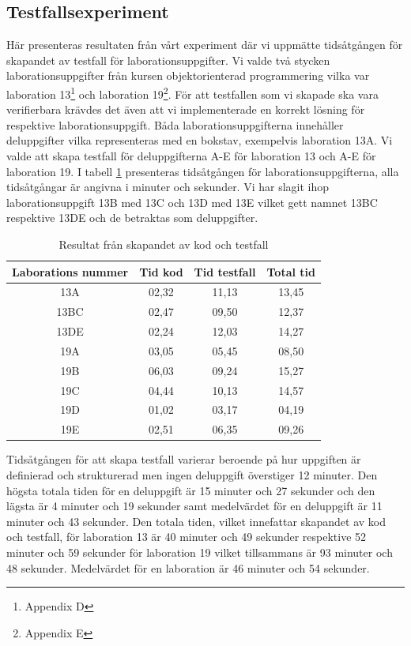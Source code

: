 \documentclass[a4paper,11pt]{article}
\begin{document}
{\subsection{Testfallsexperiment}

Här presenteras resultaten från vårt experiment där vi uppmätte tidsåtgången för skapandet av testfall för laborationsuppgifter. Vi valde två stycken laborationsuppgifter från kursen objektorienterad programmering vilka var laboration 13\footnote{Appendix D} och laboration 19\footnote{Appendix E}. För att testfallen som vi skapade ska vara verifierbara krävdes det även att vi implementerade en korrekt lösning för respektive laborationsuppgift. Båda laborationsuppgifterna innehåller deluppgifter vilka representeras med en bokstav, exempelvis laboration 13A. Vi valde att skapa testfall för deluppgifterna A-E för laboration 13 och A-E för laboration 19.  I tabell \ref{tab:Testcase} presenteras tidsåtgången för laborationsuppgifterna, alla tidsåtgångar är angivna i minuter och sekunder. Vi har slagit ihop laborationsuppgift 13B med 13C och 13D med 13E vilket gett namnet 13BC respektive 13DE och de betraktas som deluppgifter.

\begin{table}[h!]
	\centering
	\caption{Resultat från skapandet av kod och testfall}
	\label{tab:Testcase}
	\begin{tabular}{c c c c}
		\toprule
		Laborations nummer & Tid kod & Tid testfall & Total tid\\
		\midrule
		13A & 02,32 & 11,13 & 13,45\\
		13BC & 02,47 & 09,50 & 12,37\\
		13DE & 02,24 & 12,03 & 14,27\\
		\midrule
		19A 	& 03,05 & 05,45 & 08,50\\
		19B & 06,03 & 09,24 & 15,27\\
		19C & 04,44 & 10,13 & 14,57\\
		19D & 01,02 & 03,17 & 04,19\\
		19E & 02,51 & 06,35 & 09,26\\		
		\bottomrule
	\end{tabular}
\end{table}
Tidsåtgången för att skapa testfall varierar beroende på hur uppgiften är definierad och strukturerad men ingen deluppgift överstiger 12 minuter. Den högsta totala tiden för en deluppgift är 15 minuter och 27 sekunder och den lägsta är 4 minuter och 19 sekunder samt medelvärdet för en deluppgift är 11 minuter och 43 sekunder. Den totala tiden, vilket innefattar skapandet av kod och testfall, för laboration 13 är 40 minuter och 49 sekunder respektive 52 minuter och 59 sekunder för laboration 19 vilket tillsammans är 93 minuter och 48 sekunder. Medelvärdet för en laboration är 46 minuter och 54 sekunder.

}
\end{document}
